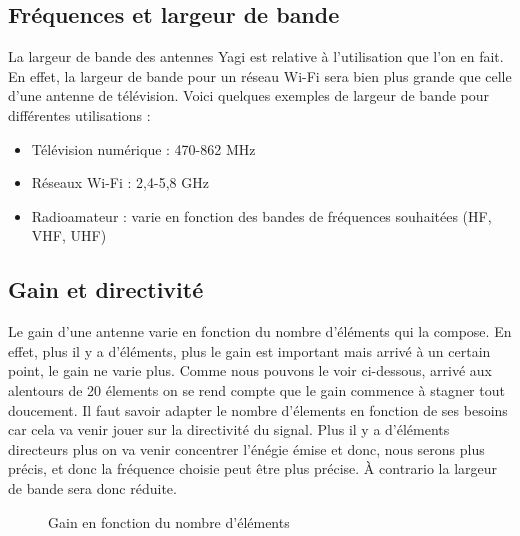 \documentclass[12pt, a4paper]{article}
\begin{document}
\subsection{Fréquences et largeur de bande}
La largeur de bande des antennes Yagi est relative 
à l'utilisation que l'on en fait. En effet, la largeur 
de bande pour un réseau Wi-Fi sera bien plus grande
que celle d'une antenne de télévision. Voici quelques 
exemples de largeur de bande pour différentes 
utilisations :\\
\begin{itemize}
    \item Télévision numérique : 470-862 MHz 
    \item Réseaux Wi-Fi : 2,4-5,8 GHz
    \item Radioamateur : varie en fonction des bandes de fréquences souhaitées (HF, VHF, UHF)
\end{itemize}

\newpage
\subsection{Gain et directivité}
Le gain d'une antenne varie en fonction 
du nombre d'éléments qui la compose. En effet, plus
il y a d'éléments, plus le gain est important mais arrivé
à un certain point, le gain ne varie plus. Comme nous 
pouvons le voir ci-dessous, arrivé aux alentours 
de 20 élements on se rend compte que le gain commence
à stagner tout doucement. Il faut savoir adapter le nombre 
d'élements en fonction de ses besoins car cela va venir jouer
sur la directivité du signal. Plus il y a d'éléments directeurs
plus on va venir concentrer l'énégie émise et donc, nous serons
plus précis, et donc la fréquence choisie peut être plus 
précise. À contrario la largeur de bande sera donc réduite.  \\ 

\begin{figure}[h]
    \centering
    \caption{Gain en fonction du nombre d'éléments}
\end{figure}
\end{document}
